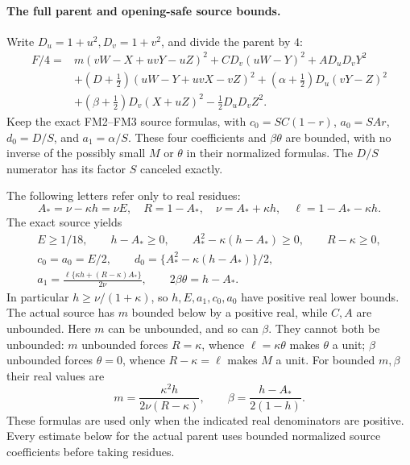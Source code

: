 \paragraph{The full parent and opening-safe source bounds.}
Write $D_u=1+u^2,D_v=1+v^2$, and divide the parent by $4$:
\[
\begin{split}
 F/4={}&m(vW-X+uvY-uZ)^2+CD_v(uW-Y)^2+AD_uD_vY^2\\
 &+(D+\tfrac12)(uW-Y+uvX-vZ)^2
 +(\alpha+\tfrac12)D_u(vY-Z)^2\\
 &+(\beta+\tfrac12)D_v(X+uZ)^2-\tfrac12D_uD_vZ^2.
\end{split}\tag{FU2}
\]
Keep the exact FM2--FM3 source formulas, with
$c_0=SC(1-r)$, $a_0=SAr$, $d_0=D/S$, and $a_1=\alpha/S$.
These four coefficients and $\beta\theta$ are bounded, with no
inverse of the possibly small $M$ or $\theta$ in their normalized
formulas. The $D/S$ numerator has its factor $S$ canceled exactly.

The following letters refer only to real residues:
\[
 A_* =\nu-\kappa h=\nu E,\quad R=1-A_*,\quad
 \nu=A_*+\kappa h,\quad\ell=1-A_*-\kappa h.
 \tag{FU3}
\]
The exact source yields
\[
\begin{gathered}
 E\ge1/18,\qquad h-A_*\ge0,\qquad
 A_*^2-\kappa(h-A_*)\ge0,\qquad R-\kappa\ge0,\\
 c_0=a_0=E/2,\qquad
 d_0=\{A_*^2-\kappa(h-A_*)\}/2,\\
 a_1=\frac{\ell\{\kappa h+(R-\kappa)A_*\}}{2\nu},
 \qquad 2\beta\theta=h-A_*.
\end{gathered}\tag{FU4}
\]
In particular $h\ge\nu/(1+\kappa)$, so $h,E,a_1,c_0,a_0$
have positive real lower bounds. The actual source has $m$ bounded
below by a positive real, while $C,A$ are unbounded. Here $m$
can be unbounded, and so can $\beta$. They cannot both be unbounded:
$m$ unbounded forces $R=\kappa$, whence
$\ell=\kappa\theta$ makes $\theta$ a unit; $\beta$ unbounded
forces $\theta=0$, whence $R-\kappa=\ell$ makes $M$ a unit.
For bounded $m,\beta$ their real values are
\[
 m=\frac{\kappa^2h}{2\nu(R-\kappa)},\qquad
 \beta=\frac{h-A_*}{2(1-h)}.
 \tag{FU5}
\]
These formulas are used only when the indicated real denominators
are positive. Every estimate below for the actual parent uses
bounded normalized source coefficients before taking residues.

